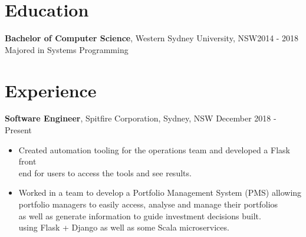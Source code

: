 \documentclass[margin]{res}
\begin{document}

\address{{\bf Present Address} \\ 26/23-25 John Street\\ Lidcombe, NSW 2141  \\
        +61414329597 }
\address{{\bf Email Address} \\ ben.hili1994@gmail.com }


\begin{resume}

\section{Education}
	{\bf Bachelor of Computer Science}, Western Sydney University, NSW\hfill 2014 - 2018\\ 
	Majored in Systems Programming

\section{Experience}
{\bf Software Engineer}, 
	Spitfire Corporation, Sydney, NSW \hfill December 2018 - Present
\begin{itemize} \itemsep 0pt  %
\item Created automation tooling for the operations team and developed a Flask front \\
	end for users to access the tools and see results.
\item Worked in a team to develop a Portfolio Management System (PMS) allowing \\
	portfolio managers to easily access, analyse and manage their portfolios \\
		as well as generate information to guide investment decisions built. \\
		using Flask + Django as well as some Scala microservices.
	
\end{itemize}


\end{resume}
\end{document}
